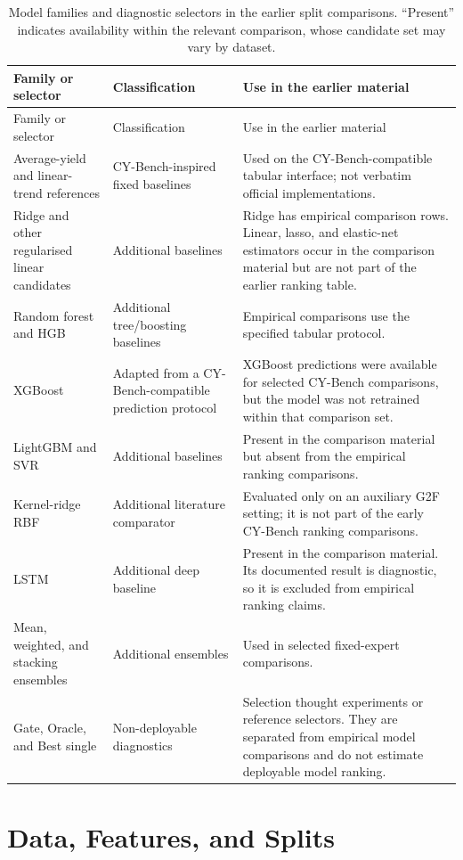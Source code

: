 \documentclass[runningheads]{venue/lncs/llncs}
\begin{document}
{\scriptsize
\begin{longtable}{p{2.8cm}p{3.0cm}p{5.7cm}}
\caption{Model families and diagnostic selectors in the earlier split comparisons. ``Present'' indicates availability within the relevant comparison, whose candidate set may vary by dataset.}\label{tab:early-models}\\
\toprule
Family or selector & Classification & Use in the earlier material\\
\midrule
\endfirsthead
\toprule
Family or selector & Classification & Use in the earlier material\\
\midrule
\endhead
Average-yield and linear-trend references & CY-Bench-inspired fixed baselines & Used on the CY-Bench-compatible tabular interface; not verbatim official implementations.\\
Ridge and other regularised linear candidates & Additional baselines & Ridge has empirical comparison rows. Linear, lasso, and elastic-net estimators occur in the comparison material but are not part of the earlier ranking table.\\
Random forest and HGB & Additional tree/boosting baselines & Empirical comparisons use the specified tabular protocol.\\
XGBoost & Adapted from a CY-Bench-compatible prediction protocol & XGBoost predictions were available for selected CY-Bench comparisons, but the model was not retrained within that comparison set.\\
LightGBM and SVR & Additional baselines & Present in the comparison material but absent from the empirical ranking comparisons.\\
Kernel-ridge RBF & Additional literature comparator & Evaluated only on an auxiliary G2F setting; it is not part of the early CY-Bench ranking comparisons.\\
LSTM & Additional deep baseline & Present in the comparison material. Its documented result is diagnostic, so it is excluded from empirical ranking claims.\\
Mean, weighted, and stacking ensembles & Additional ensembles & Used in selected fixed-expert comparisons.\\
Gate, Oracle, and Best single & Non-deployable diagnostics & Selection thought experiments or reference selectors. They are separated from empirical model comparisons and do not estimate deployable model ranking.\\
\bottomrule
\end{longtable}
}

\section{Data, Features, and Splits}
\end{document}
